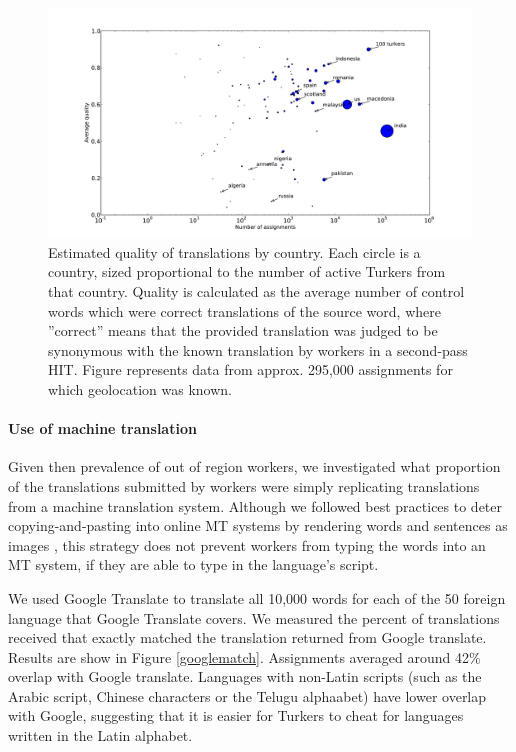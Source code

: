 \documentclass[11pt]{article}
\begin{document}
\begin{figure}[h]
\begin{center}
\includegraphics[width=.8\linewidth]{final-figures/quality-scatter}
\end{center}

\caption{Estimated quality of translations by country. Each circle is a country, sized proportional to the number of active Turkers from that country. Quality is calculated as the average number of control words which were correct translations of the source word, where ”correct” means that the provided translation was judged to be synonymous with the known translation by workers in a second-pass HIT. Figure represents data from approx. 295,000 assignments for which geolocation was known.}
\label{quality-scatter}
\end{figure}

\paragraph{Use of machine translation}

Given then prevalence of out of region workers, we investigated what proportion of the translations submitted by workers were simply replicating translations from a machine translation system.  Although we followed best practices to deter copying-and-pasting into online MT systems  by  rendering words and sentences as images \cite{zaidan-callisonburch:2011:ACL-HLT2011a}, this strategy does not prevent workers from typing the words into an MT system, if they are able to type in the language's script. 

We used Google Translate to translate all 10,000 words for each of the 50 foreign language that Google Translate covers. We measured the percent of translations received that exactly matched the translation returned from Google translate. Results are show in Figure \ref{googlematch}. 
Assignments averaged around 42\% overlap with Google translate.  Languages with non-Latin scripts (such as the Arabic script, Chinese characters or the Telugu alphaabet) have lower overlap with Google, suggesting that it is easier for Turkers to cheat for languages written in the Latin alphabet. 
\end{document}
